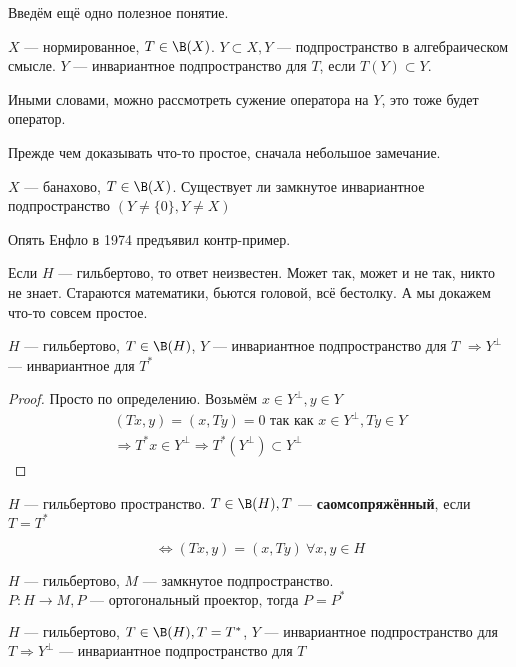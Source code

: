 \documentclass[document]{subfiles}
\begin{document}
Введём ещё одно полезное понятие.
\begin{definition}
    $X$ --- нормированное, $T \in \B(X)$. $Y \subset X, Y$ --- подпространство в алгебраическом смысле. $Y$ --- инвариантное подпространство для $T$, если $T(Y) \subset Y$.
\end{definition}
Иными словами, можно рассмотреть сужение оператора на $Y$, это тоже будет оператор.

Прежде чем доказывать что-то простое, сначала небольшое замечание.
\begin{remark}
    $X$ --- банахово, $T \in \B(X)$. Существует ли замкнутое инвариантное подпространство $(Y \ne \{ 0 \}, Y \ne X)$
\end{remark}

Опять Енфло в 1974 предъявил контр-пример.

Если $H$ --- гильбертово, то ответ неизвестен. Может так, может и не так, никто не знает. Стараются математики, бьются головой, всё бестолку. А мы докажем что-то совсем простое.

\begin{theorem}
    $H$ --- гильбертово, $T \in \B(H)$, $Y$ --- инвариантное подпространство для $T$ $\Rightarrow Y^\perp$ --- инвариантное для $T^*$
\end{theorem}

\begin{proof}
    Просто по определению. Возьмём $x \in Y^\perp, y \in Y$
    \begin{gather*}
        (Tx, y) = (x, Ty) = 0 \text{ так как } x \in Y^\perp, Ty \in Y \\
        \Rightarrow T^* x \in Y^\perp \Rightarrow T^*(Y^\perp) \subset Y^\perp
    \end{gather*}
\end{proof}

\begin{definition}
    $H$ --- гильбертово пространство. $T \in \B(H), T$ --- \textbf{саомсопряжённый}, если $T = T^*$
\end{definition} 
\[ \Leftrightarrow (Tx, y) = (x, Ty) \: \forall x, y \in H \]

\begin{example}
    $H$ --- гильбертово, $M$ --- замкнутое подпространство. $P: H \rightarrow M, P \text{ --- ортогональный проектор, тогда } P = P^*$
\end{example}

\begin{corollary}
    $H$ --- гильбертово, $T \in \B(H), T = T^*$, $Y$ --- инвариантное подпространство для $T \Rightarrow Y^\perp$  ---
    инвариантное подпространство для $T$
\end{corollary}
\end{document}
